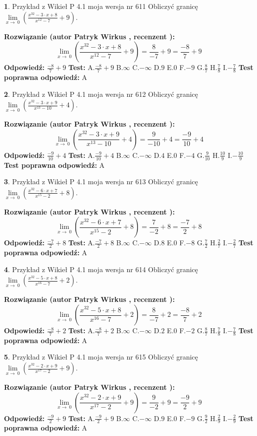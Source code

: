 \documentclass[12pt, a4paper]{article}
\theoremstyle{definition} %
\newtheorem{zad}{}
\newcommand{\zadStart}[1]{\begin{zad}#1\newline}
\newcommand{\zadStop}{\end{zad}}
\newcommand{\rozwStart}[2]{\noindent \textbf{Rozwiązanie (autor #1 , recenzent #2): }\newline}
\newcommand{\rozwStop}{\newline}
\newcommand{\odpStart}{\noindent \textbf{Odpowiedź:}\newline}
\newcommand{\odpStop}{\newline}
\newcommand{\testStart}{\noindent \textbf{Test:}\newline}
\newcommand{\testStop}{\newline}
\newcommand{\kluczStart}{\noindent \textbf{Test poprawna odpowiedź:}\newline}
\newcommand{\kluczStop}{\newline}
\begin{document}
\zadStart{Przykład z Wikieł P 4.1 moja wersja nr 611}
Obliczyć granicę $\lim\limits_{x\to\ 0}(\frac{x^{32}-3 \cdot x +8}{x^{12}-7}+9)$.
\zadStop
\rozwStart{Patryk Wirkus}{}
$$\lim\limits_{x\to\ 0}(\frac{x^{32}-3 \cdot x +8}{x^{12}-7}+9)=\frac{8}{-7}+9=\frac{-8}{7}+9$$
\rozwStop
\odpStart
$\frac{-8}{7}+9$
\odpStop
\testStart
A.$\frac{-8}{7}+9$
B.$\infty$
C.$-\infty$
D.$9$
E.$0$
F.$-9$
G.$\frac{8}{7}$
H.$\frac{7}{8}$
I.$-\frac{7}{8}$
\testStop
\kluczStart
A
\kluczStop



\zadStart{Przykład z Wikieł P 4.1 moja wersja nr 612}
Obliczyć granicę $\lim\limits_{x\to\ 0}(\frac{x^{32}-3 \cdot x +9}{x^{13}-10}+4)$.
\zadStop
\rozwStart{Patryk Wirkus}{}
$$\lim\limits_{x\to\ 0}(\frac{x^{32}-3 \cdot x +9}{x^{13}-10}+4)=\frac{9}{-10}+4=\frac{-9}{10}+4$$
\rozwStop
\odpStart
$\frac{-9}{10}+4$
\odpStop
\testStart
A.$\frac{-9}{10}+4$
B.$\infty$
C.$-\infty$
D.$4$
E.$0$
F.$-4$
G.$\frac{9}{10}$
H.$\frac{10}{9}$
I.$-\frac{10}{9}$
\testStop
\kluczStart
A
\kluczStop



\zadStart{Przykład z Wikieł P 4.1 moja wersja nr 613}
Obliczyć granicę $\lim\limits_{x\to\ 0}(\frac{x^{32}-6 \cdot x +7}{x^{15}-2}+8)$.
\zadStop
\rozwStart{Patryk Wirkus}{}
$$\lim\limits_{x\to\ 0}(\frac{x^{32}-6 \cdot x +7}{x^{15}-2}+8)=\frac{7}{-2}+8=\frac{-7}{2}+8$$
\rozwStop
\odpStart
$\frac{-7}{2}+8$
\odpStop
\testStart
A.$\frac{-7}{2}+8$
B.$\infty$
C.$-\infty$
D.$8$
E.$0$
F.$-8$
G.$\frac{7}{2}$
H.$\frac{2}{7}$
I.$-\frac{2}{7}$
\testStop
\kluczStart
A
\kluczStop



\zadStart{Przykład z Wikieł P 4.1 moja wersja nr 614}
Obliczyć granicę $\lim\limits_{x\to\ 0}(\frac{x^{32}-5 \cdot x +8}{x^{16}-7}+2)$.
\zadStop
\rozwStart{Patryk Wirkus}{}
$$\lim\limits_{x\to\ 0}(\frac{x^{32}-5 \cdot x +8}{x^{16}-7}+2)=\frac{8}{-7}+2=\frac{-8}{7}+2$$
\rozwStop
\odpStart
$\frac{-8}{7}+2$
\odpStop
\testStart
A.$\frac{-8}{7}+2$
B.$\infty$
C.$-\infty$
D.$2$
E.$0$
F.$-2$
G.$\frac{8}{7}$
H.$\frac{7}{8}$
I.$-\frac{7}{8}$
\testStop
\kluczStart
A
\kluczStop



\zadStart{Przykład z Wikieł P 4.1 moja wersja nr 615}
Obliczyć granicę $\lim\limits_{x\to\ 0}(\frac{x^{32}-2 \cdot x +9}{x^{17}-2}+9)$.
\zadStop
\rozwStart{Patryk Wirkus}{}
$$\lim\limits_{x\to\ 0}(\frac{x^{32}-2 \cdot x +9}{x^{17}-2}+9)=\frac{9}{-2}+9=\frac{-9}{2}+9$$
\rozwStop
\odpStart
$\frac{-9}{2}+9$
\odpStop
\testStart
A.$\frac{-9}{2}+9$
B.$\infty$
C.$-\infty$
D.$9$
E.$0$
F.$-9$
G.$\frac{9}{2}$
H.$\frac{2}{9}$
I.$-\frac{2}{9}$
\testStop
\kluczStart
A
\kluczStop
\end{document}

